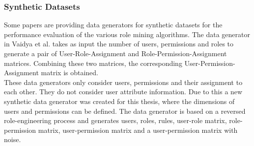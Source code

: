 \subsubsection{Synthetic Datasets}
Some papers are providing data generators for synthetic datasets for the performance evaluation of the various role mining algorithms. The data generator in Vaidya et al.\cite{Vaidya:2006:RMR:1180405.1180424} takes as input the number of users, permissions and roles to generate a pair of User-Role-Assignment and Role-Permission-Assignment matrices. Combining these two matrices, the corresponding User-Permission-Assignment matrix is obtained.\\

These data generators only consider users, permissions and their assignment to each other. They do not consider user attribute information. Due to this a new synthetic data generator was created for this thesis, where the dimensions of users and permissions can be defined. The data generator is based on a reversed role-engineering process and generates users, roles, rules, user-role matrix, role-permission matrix, user-permission matrix and a user-permission matrix with noise.

